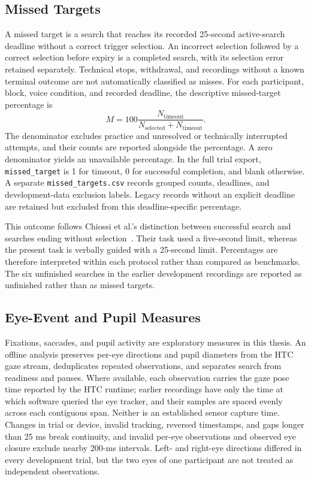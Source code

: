 \subsection{Missed Targets}
A missed target is a search that reaches its recorded 25-second active-search deadline without a correct trigger selection. An incorrect selection followed by a correct selection before expiry is a completed search, with its selection error retained separately. Technical stops, withdrawal, and recordings without a known terminal outcome are not automatically classified as misses. For each participant, block, voice condition, and recorded deadline, the descriptive missed-target percentage is
\begin{equation}
M=100\frac{N_{\mathrm{timeout}}}{N_{\mathrm{selected}}+N_{\mathrm{timeout}}}.
\end{equation}
The denominator excludes practice and unresolved or technically interrupted attempts, and their counts are reported alongside the percentage. A zero denominator yields an unavailable percentage. In the full trial export, \texttt{missed\_target} is 1 for timeout, 0 for successful completion, and blank otherwise. A separate \texttt{missed\_targets.csv} records grouped counts, deadlines, and development-data exclusion labels. Legacy records without an explicit deadline are retained but excluded from this deadline-specific percentage.

This outcome follows Chiossi et al.'s distinction between successful search and searches ending without selection~\cite{chiossi2024searching}. Their task used a five-second limit, whereas the present task is verbally guided with a 25-second limit. Percentages are therefore interpreted within each protocol rather than compared as benchmarks. The six unfinished searches in the earlier development recordings are reported as unfinished rather than as missed targets.

\subsection{Eye-Event and Pupil Measures}
Fixations, saccades, and pupil activity are exploratory measures in this thesis. An offline analysis preserves per-eye directions and pupil diameters from the HTC gaze stream, deduplicates repeated observations, and separates search from readiness and pauses. Where available, each observation carries the gaze pose time reported by the HTC runtime; earlier recordings have only the time at which software queried the eye tracker, and their samples are spaced evenly across each contiguous span. Neither is an established sensor capture time. Changes in trial or device, invalid tracking, reversed timestamps, and gaps longer than 25 ms break continuity, and invalid per-eye observations and observed eye closure exclude nearby 200-ms intervals. Left- and right-eye directions differed in every development trial, but the two eyes of one participant are not treated as independent observations.

